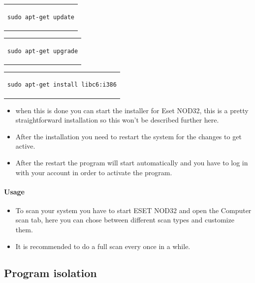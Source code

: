 \documentclass[a4paper,10pt]{article}
\begin{document}
\begin{center}
\begin{tabular}{c}
\begin{lstlisting}
sudo apt-get update

\end{lstlisting}
\end{tabular}
\end{center}

\begin{center}
\begin{tabular}{c}
\begin{lstlisting}
sudo apt-get upgrade
\end{lstlisting}
\end{tabular}
\end{center}

\begin{center}
\begin{tabular}{c}
\begin{lstlisting}
sudo apt-get install libc6:i386
\end{lstlisting}
\end{tabular}
\end{center}

\begin{itemize}[leftmargin=*]
\item when this is done you can start the installer for Eset NOD32, this is a pretty straightforward installation so this won't be described further here.
\item After the installation you need to restart the system for the changes to get active.
\item After the restart the program will start automatically and you have to log in with your account in order to activate the program.
\end{itemize}

\paragraph*{Usage}
\begin{itemize}[leftmargin=*]
\item To scan your system you have to start ESET NOD32 and open the Computer scan tab, here you can chose between different scan types and customize them.
\item It is recommended to do a full scan every once in a while.
\end{itemize}

\subsection{Program isolation}
\end{document}
